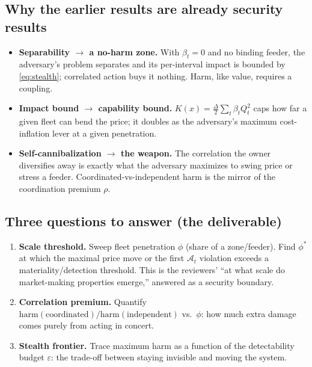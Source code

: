 \documentclass[11pt]{article}
\begin{document}
\subsection{Why the earlier results are already security results}
\begin{itemize}
\item \textbf{Separability $\to$ a no-harm zone.} With $\beta_t=0$ and no
binding feeder, the adversary's problem separates and its per-interval impact
is bounded by \eqref{eq:stealth}; correlated action buys it nothing. Harm, like
value, requires a coupling.
\item \textbf{Impact bound $\to$ capability bound.} $K(x)=\tfrac{\Delta}{2}
\sum_t\beta_tQ_t^2$ caps how far a given fleet can bend the price; it doubles
as the adversary's maximum cost-inflation lever at a given penetration.
\item \textbf{Self-cannibalization $\to$ the weapon.} The correlation the owner
diversifies away is exactly what the adversary maximizes to swing price or
stress a feeder. Coordinated-vs-independent harm is the mirror of the
coordination premium $\rho$.
\end{itemize}

\subsection{Three questions to answer (the deliverable)}
\begin{enumerate}
\item \textbf{Scale threshold.} Sweep fleet penetration $\phi$ (share of a
zone/feeder). Find $\phi^\ast$ at which the maximal price move or the first
$\mathcal A_t$ violation exceeds a materiality/detection threshold. This is the
reviewers' ``at what scale do market-making properties emerge,'' answered as a
security boundary.
\item \textbf{Correlation premium.} Quantify
$\text{harm}(\text{coordinated})/\text{harm}(\text{independent})$ vs.\ $\phi$:
how much extra damage comes purely from acting in concert.
\item \textbf{Stealth frontier.} Trace maximum harm as a function of the
detectability budget $\varepsilon$: the trade-off between staying invisible and
moving the system.
\end{enumerate}
\end{document}
